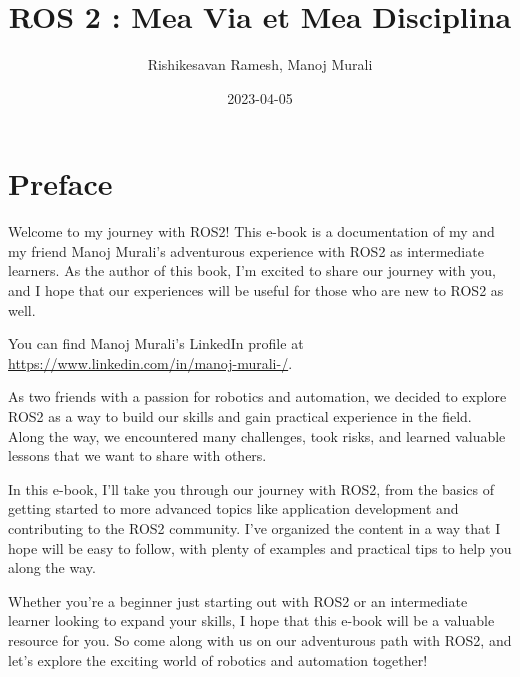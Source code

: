 \documentclass[
  letterpaper,
  DIV=11,
  numbers=noendperiod]{scrreprt}
\title{ROS 2 : Mea Via et Mea Disciplina}
\author{Rishikesavan Ramesh, Manoj Murali}
\date{2023-04-05}
\renewcommand*\contentsname{Table of contents}
\newcommand\contentsname{Table of contents}
\begin{document}
\maketitle
\ifdefined\Shaded\renewenvironment{Shaded}{\begin{tcolorbox}[interior hidden, boxrule=0pt, frame hidden, borderline west={3pt}{0pt}{shadecolor}, enhanced, sharp corners, breakable]}{\end{tcolorbox}}\fi

\renewcommand*\contentsname{Table of contents}
{
\hypersetup{linkcolor=}
\setcounter{tocdepth}{2}
\tableofcontents
}

\hypertarget{preface}{%
\chapter*{Preface}\label{preface}}


Welcome to my journey with ROS2! This e-book is a documentation of my
and my friend Manoj Murali's adventurous experience with ROS2 as
intermediate learners. As the author of this book, I'm excited to share
our journey with you, and I hope that our experiences will be useful for
those who are new to ROS2 as well.

You can find Manoj Murali's LinkedIn profile at
\url{https://www.linkedin.com/in/manoj-murali-/}.

As two friends with a passion for robotics and automation, we decided to
explore ROS2 as a way to build our skills and gain practical experience
in the field. Along the way, we encountered many challenges, took risks,
and learned valuable lessons that we want to share with others.

In this e-book, I'll take you through our journey with ROS2, from the
basics of getting started to more advanced topics like application
development and contributing to the ROS2 community. I've organized the
content in a way that I hope will be easy to follow, with plenty of
examples and practical tips to help you along the way.

Whether you're a beginner just starting out with ROS2 or an intermediate
learner looking to expand your skills, I hope that this e-book will be a
valuable resource for you. So come along with us on our adventurous path
with ROS2, and let's explore the exciting world of robotics and
automation together!

\end{document}
